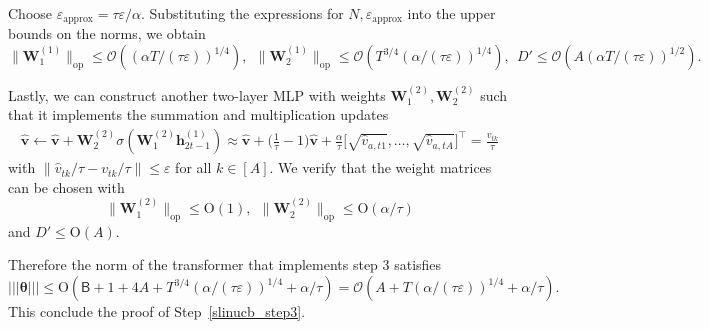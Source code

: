 \documentclass[10pt]{article}
\renewcommand{\hat}{\widehat}
\newcommand{\eps}{\varepsilon}
\newcommand{\lops}[1]{\|{#1}\|_{\mathrm{op}}}
\renewcommand{\cO}{\mathcal{O}}
\newcommand{\<}{\left\langle}
\renewcommand{\>}{\right\rangle}
\newcommand{\nrmp}[1]{{\left|\!\left|\!\left|{#1}\right|\!\right|\!\right|}}
\newcommand{\appr}{{\mathrm{approx}}}  %
\newcommand{\temp}{{\tau}}
\newcommand{\cwid}{{\alpha}}  %
\newcommand{\hidden}{{D'}}
\newcommand{\tfthres}{{\mathsf{B}}}   %
\newcommand{\conO}{{\mathrm{O}}}
\def\bW{{\mathbf W}}
\def\btheta{{\boldsymbol \theta}}
\def\bh{{\mathbf h}}
\def\bv{{\mathbf v}}
\begin{document}
 Choose $\eps_{\appr}=\temp\eps/\alpha$. Substituting the expressions for $N,\eps_\appr$ into the upper bounds on the norms, we obtain
 $$\lops{\bW_1^{(1)}}\leq \cO(({\alpha T/(\temp\eps)})^{1/4}),~~\lops{\bW_2^{(1)}}\leq \cO(T^{3/4}({\alpha/(\temp\eps)})^{1/4}),~~\hidden\leq \cO(A({\alpha T/(\temp\eps)})^{1/2}).$$

 
 Lastly, we can construct another two-layer MLP with weights $\bW^{(2)}_1,\bW^{(2)}_2$ such that it implements the summation and multiplication updates 
 \begin{align*}
 \hat\bv\leftarrow\hat\bv+\bW^{(2)}_2\sigma(\bW^{(2)}_1\bh_{2t-1}^{(1)})\approx\hat\bv+\Big(\frac1\temp-1\Big)\hat\bv+\frac\alpha\temp\Big[\sqrt{ \hat v_{a,t1}},\ldots,\sqrt{ \hat v_{a,tA}}\Big]^\top=\frac{\hat v_{tk}}{\temp}
 \end{align*}
with $\|\hat v_{tk}/\temp-v_{tk}/\temp\|\leq \eps$ for all $k\in[A]$. We verify that the weight matrices can be chosen with
  $$
 \lops{\bW^{(2)}_1}\leq \conO(1),~~ \lops{\bW^{(2)}_2}\leq \conO(\alpha/\temp)
 $$ and $\hidden\leq \conO(A)$.

 Therefore the norm of the transformer that implements step 3 satisfies $$
 \nrmp{\btheta}\leq \conO(\tfthres+1+4A+T^{3/4}({\alpha/(\temp\eps)})^{1/4}+\cwid/\temp)=
 \cO(A+T({\alpha/(\temp\eps)})^{1/4}+\alpha/\temp).$$  This conclude the proof of Step~\ref{slinucb_step3}. 
\end{document}
